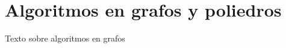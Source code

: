 \section{Algoritmos en grafos y poliedros}
\label{sec:algoritmos-grafos}
Texto sobre algoritmos en grafos
